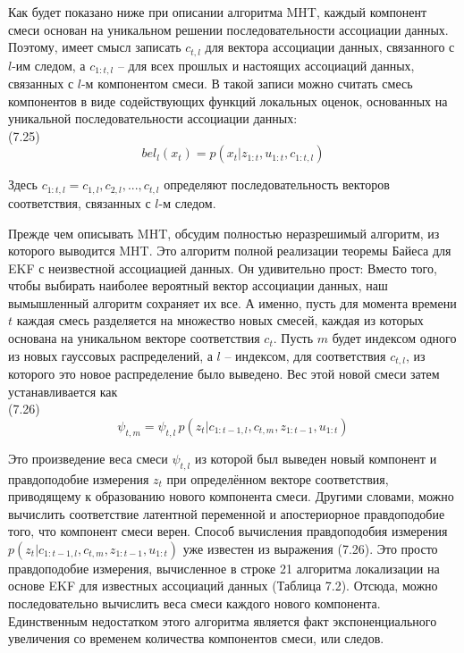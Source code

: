 \documentclass[10pt,a4paper]{article}
\begin{document}
Как будет показано ниже при описании алгоритма MHT, каждый компонент смеси основан на уникальном решении последовательности  ассоциации данных. Поэтому, имеет смысл записать $c_{t,l}$ для вектора ассоциации данных, связанного с $l$-им следом, а $c_{1:t,l}$ – для всех прошлых и настоящих ассоциаций данных, связанных с $l$-м компонентом смеси. В такой записи можно считать смесь компонентов в виде содействующих функций локальных оценок, основанных на уникальной последовательности ассоциации данных:\\

(7.25)
$$bel_l(x_t)=p(x_t|z_{1:t},u_{1:t},c_{1:t,l})$$

Здесь $c_{1:t,l}={c_{1,l}, c_{2,l}, . . . , c_{t,l}}$ определяют последовательность векторов соответствия, связанных с $l$-м следом.

Прежде чем описывать MHT,  обсудим полностью неразрешимый алгоритм, из которого выводится MHT. Это алгоритм полной реализации теоремы Байеса для EKF с неизвестной ассоциацией данных.
Он удивительно прост: Вместо того, чтобы выбирать наиболее вероятный вектор ассоциации данных, наш вымышленный алгоритм сохраняет их все. А именно, пусть для момента времени $t$ каждая смесь разделяется на множество новых смесей, каждая из которых основана на уникальном векторе соответствия $c_t$. Пусть $m$ будет индексом одного из новых гауссовых распределений, а $l$ – индексом, для соответствия $c_{t,l}$, из которого это новое распределение было выведено. Вес этой новой смеси затем устанавливается как \\

(7.26)
$$\psi_{t,m}=\psi_{t,l}\,p(z_t|c_{1:t-1,l},c_{t,m},z_{1:t-1},u_{1:t})$$

Это произведение веса смеси $\psi_{t,l}$ из которой был выведен новый компонент и правдоподобие измерения $z_t$ при определённом векторе соответствия, приводящему к образованию нового компонента смеси. Другими словами, можно вычислить соответствие латентной переменной и апостериорное правдоподобие того, что компонент смеси верен. Способ вычисления правдоподобия измерения $p(z_t | c_{1:t-1,l}, c_{t,m}, z_{1:t-1}, u_{1:t})$ уже известен из выражения (7.26). Это просто правдоподобие измерения, вычисленное в строке 21 алгоритма локализации на основе EKF для известных ассоциаций данных (Таблица 7.2). Отсюда, можно последовательно вычислить веса смеси каждого нового компонента. Единственным недостатком этого алгоритма является факт экспоненциального увеличения со временем количества компонентов смеси, или следов. 
\end{document}
